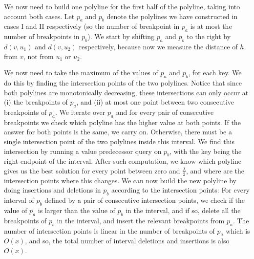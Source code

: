 \documentclass[a4paper,UKenglish]{lipics-v2016}
\theoremstyle{plain}
\begin{document}

\medskip {}
We now need to build one polyline for the first half of the polyline, taking into account both cases. Let $p_a$ and $p_b$ denote the polylines we have constructed in cases I and II respectively (so the number of breakpoint in $p_a$ is at most the number of breakpoints in $p_b$). We start by shifting $p_a$ and $p_b$ to the right by $d(v,u_1)$ and $d(v,u_2)$ respectively, because now we measure the distance of $h$ from $v$, not from $u_1$ or $u_2$. 

We now need to take the maximum of the values of $p_a$ and $p_b$, for each key. We do this by finding the intersection points of the two polylines. Notice that since both polylines are monotonically decreasing, these intersections can only occur at (i) the breakpoints of $p_a$, and (ii) at most one point between two consecutive breakpoints of $p_a$. We iterate over $p_a$ and for every pair of consecutive breakpoints we check which polyline has the higher value at both points. If the answer for both points is the same, we carry on. Otherwise, there must be a single intersection point of the two polylines inside this interval. We find this intersection by running a value predecessor query on $p_b$, with the key being the right endpoint of the interval. After such computation, we know which polyline gives us the best solution for every point between zero and $\frac{\lambda}{2}$, and where are the intersection points where this changes. We can now build the new polyline by doing insertions and deletions in $p_b$ according to the intersection points: For every interval of $p_b$ defined by a pair of consecutive intersection points, we check if the value of $p_a$ is larger than the value of $p_b$ in the interval, and if so, delete all the breakpoints of $p_b$ in the interval, and insert the relevant breakpoints from $p_a$. The number of intersection points is linear in the number of breakpoints of $p_a$ which is $O(x)$, and so, the total number of interval deletions and insertions is also $O(x)$.
\end{document}
